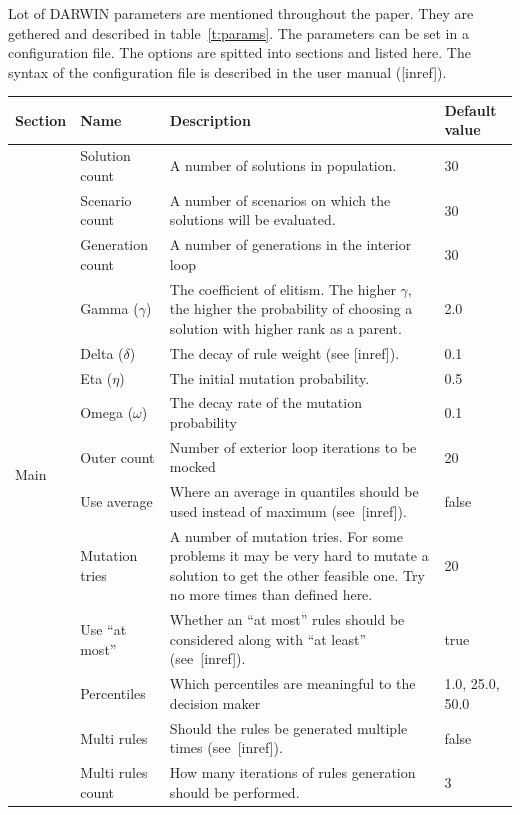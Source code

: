 Lot of DARWIN parameters are mentioned throughout the paper. They are gethered
and described in table~\ref{t:params}. The parameters can be set in a
configuration file. The options are spitted into sections and listed here. The
syntax of the configuration file is described in the user manual ([inref]).

\begin{table}
  \centering
  \begin{tabular}{l l p{7cm} l}
    \hline
   Section &  Name & Description & Default value \\
    \hline
    \hline
    \multirow{15}{*}{Main} & 
    Solution count & A number of solutions in population. & 30 \\
    & Scenario count & A number of scenarios on which the solutions will be evaluated.  & 30 \\
    & Generation count & A number of generations in the interior loop & 30 \\
    & Gamma ($\gamma$) & The coefficient of elitism. The higher $\gamma$, the
      higher the probability of choosing a solution with higher rank as a
      parent. & 2.0  \\
    & Delta ($\delta$) & The decay of rule weight (see [inref]). & 0.1  \\
    & Eta ($\eta$) & The initial mutation probability.  & 0.5    \\
    & Omega ($\omega$)& The decay rate of the mutation probability & 0.1  \\
    & Outer count & Number of exterior loop iterations to be mocked & 20 \\
    & Use average & Where an average in quantiles should be used instead of maximum (see~[inref]). & false  \\
    & Mutation tries & A number of mutation tries. For some problems it may be
      very hard to mutate a solution to get the other feasible one. Try no more
      times than defined here.  & 20  \\
    & Use ``at most'' & Whether an ``at most'' rules should be considered
    along with ``at least'' (see~[inref]). & true \\
    & Percentiles & Which percentiles are meaningful to the decision maker & 1.0, 25.0, 50.0  \\
    & Multi rules & Should the rules be generated multiple times (see~[inref]). & false \\
    & Multi rules count & How many iterations of rules generation should be performed. & 3 \\

\end{tabular}
\end{table}
